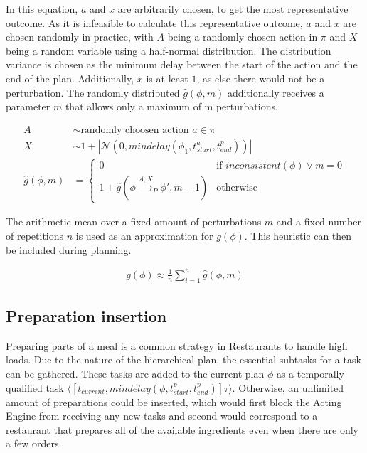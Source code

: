 In this equation, $a$ and $x$ are arbitrarily chosen, to get the most representative outcome.
As it is infeasible to calculate this representative outcome, $a$ and $x$ are chosen randomly in practice, with $A$ being a randomly chosen action in $\pi$ and $X$ being a random variable using a half-normal distribution.
The distribution variance is chosen as the minimum delay between the start of the action and the end of the plan.
Additionally, $x$ is at least $1$, as else there would not be a perturbation.
The randomly distributed $\hat{g}(\phi,m)$ additionally receives a parameter $m$ that allows only a maximum of m perturbations.

\begin{align}
    A &\sim \text{randomly choosen action } a \in \pi\\
    X &\sim  1 + |\mathcal{N}(0,mindelay(\phi_1,t^a_{start},t^p_{end}))| \\
    \hat{g}(\phi,m) &= \begin{cases}
        0 &\text{if } inconsistent(\phi) \lor m = 0 \\
        1 + \hat{g}(\phi \xrightarrow{A,X}_P \phi', m - 1) &\text{otherwise}
    \end{cases}
\end{align}

The arithmetic mean over a fixed amount of perturbations $m$ and a fixed number of repetitions $n$ is used as an approximation for $g(\phi)$.
This heuristic can then be included during planning.

\begin{align}
    g(\phi) \approx \frac{1}{n} \sum_{i=1}^{n} \hat{g}(\phi,m)
\end{align}

\subsection{Preparation insertion}
\label{sec:approach-preparation}

Preparing parts of a meal is a common strategy in Restaurants to handle high loads.
Due to the nature of the hierarchical plan, the essential subtasks for a task can be gathered.
These tasks are added to the current plan $\phi$ as a temporally qualified task $\langle[t_{current}, mindelay(\phi,t^p_{start}, t^p_{end})] \tau \rangle$.
Otherwise, an unlimited amount of preparations could be inserted, which would first block the Acting Engine from receiving any new tasks and second would correspond to a restaurant that prepares all of the available ingredients even when there are only a few orders.

